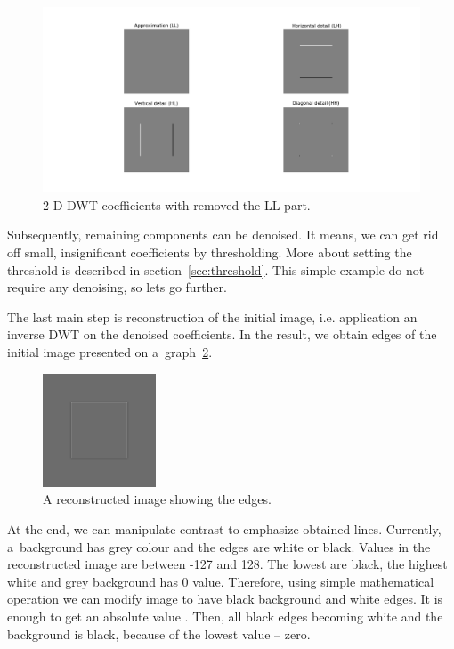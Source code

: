 \begin{figure}[h]
	\centering
	\includegraphics[width=\textwidth]{graphs/square_db2_coeffs_d.png}
	\caption{2-D DWT coefficients with removed the LL part.}
	\label{fig:square_coeffs_d}
\end{figure}

Subsequently, remaining components can be denoised. It means, we can get rid off small, insignificant coefficients by thresholding. More about setting the threshold is described in section~\ref{sec:threshold}. This simple example do not require any denoising, so lets go further.

The last main step is reconstruction of the initial image, i.e. application an inverse DWT on the denoised coefficients. In the result, we obtain edges of the initial image presented on a~graph~\ref{fig:square_idwt}.

\begin{figure}[h]
	\centering
	\includegraphics[width=0.3\textwidth]{graphs/square_db2.png}
	\caption{A reconstructed image showing the edges.}
	\label{fig:square_idwt}
\end{figure}

At the end, we can manipulate contrast to emphasize obtained lines. Currently, a~background has grey colour and the edges are white or black. Values in the reconstructed image are between -127 and 128. The lowest are black, the highest white and grey background has 0 value. Therefore, using simple mathematical operation we can modify image to have black background and white edges. It is enough to get an absolute value \cite{EdgeDetectionAlgorithm}. Then, all black edges becoming white and the background is black, because of the lowest value -- zero.

